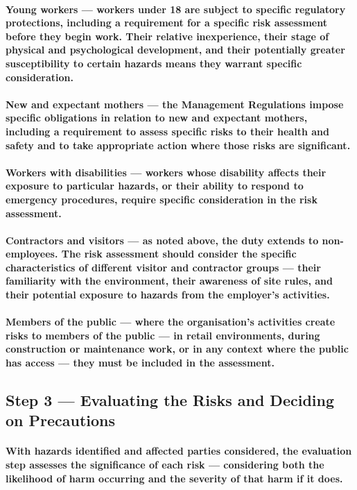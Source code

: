 \paragraph{\textbf{Young workers} — workers under 18 are subject to specific regulatory protections, including a requirement for a specific risk assessment before they begin work. Their relative inexperience, their stage of physical and psychological development, and their potentially greater susceptibility to certain hazards means they warrant specific consideration.}
\paragraph{\textbf{New and expectant mothers} — the Management Regulations impose specific obligations in relation to new and expectant mothers, including a requirement to assess specific risks to their health and safety and to take appropriate action where those risks are significant.}
\paragraph{\textbf{Workers with disabilities} — workers whose disability affects their exposure to particular hazards, or their ability to respond to emergency procedures, require specific consideration in the risk assessment.}
\paragraph{\textbf{Contractors and visitors} — as noted above, the duty extends to non-employees. The risk assessment should consider the specific characteristics of different visitor and contractor groups — their familiarity with the environment, their awareness of site rules, and their potential exposure to hazards from the employer's activities.}
\paragraph{\textbf{Members of the public} — where the organisation's activities create risks to members of the public — in retail environments, during construction or maintenance work, or in any context where the public has access — they must be included in the assessment.}

\subsection{Step 3 — Evaluating the Risks and Deciding on Precautions}
\paragraph{With hazards identified and affected parties considered, the evaluation step assesses the significance of each risk — considering both the likelihood of harm occurring and the severity of that harm if it does.}
